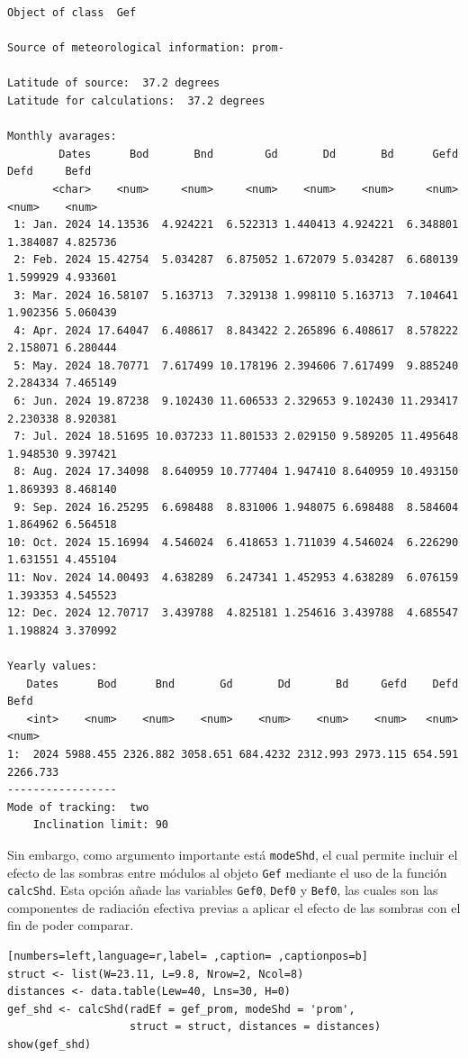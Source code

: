 \begin{verbatim}
Object of class  Gef 

Source of meteorological information: prom- 

Latitude of source:  37.2 degrees
Latitude for calculations:  37.2 degrees

Monthly avarages:
        Dates      Bod       Bnd        Gd       Dd       Bd      Gefd     Defd     Befd
       <char>    <num>     <num>     <num>    <num>    <num>     <num>    <num>    <num>
 1: Jan. 2024 14.13536  4.924221  6.522313 1.440413 4.924221  6.348801 1.384087 4.825736
 2: Feb. 2024 15.42754  5.034287  6.875052 1.672079 5.034287  6.680139 1.599929 4.933601
 3: Mar. 2024 16.58107  5.163713  7.329138 1.998110 5.163713  7.104641 1.902356 5.060439
 4: Apr. 2024 17.64047  6.408617  8.843422 2.265896 6.408617  8.578222 2.158071 6.280444
 5: May. 2024 18.70771  7.617499 10.178196 2.394606 7.617499  9.885240 2.284334 7.465149
 6: Jun. 2024 19.87238  9.102430 11.606533 2.329653 9.102430 11.293417 2.230338 8.920381
 7: Jul. 2024 18.51695 10.037233 11.801533 2.029150 9.589205 11.495648 1.948530 9.397421
 8: Aug. 2024 17.34098  8.640959 10.777404 1.947410 8.640959 10.493150 1.869393 8.468140
 9: Sep. 2024 16.25295  6.698488  8.831006 1.948075 6.698488  8.584604 1.864962 6.564518
10: Oct. 2024 15.16994  4.546024  6.418653 1.711039 4.546024  6.226290 1.631551 4.455104
11: Nov. 2024 14.00493  4.638289  6.247341 1.452953 4.638289  6.076159 1.393353 4.545523
12: Dec. 2024 12.70717  3.439788  4.825181 1.254616 3.439788  4.685547 1.198824 3.370992

Yearly values:
   Dates      Bod      Bnd       Gd       Dd       Bd     Gefd    Defd     Befd
   <int>    <num>    <num>    <num>    <num>    <num>    <num>   <num>    <num>
1:  2024 5988.455 2326.882 3058.651 684.4232 2312.993 2973.115 654.591 2266.733
-----------------
Mode of tracking:  two 
    Inclination limit: 90
\end{verbatim}

Sin embargo, como argumento importante está \texttt{modeShd}, el cual permite incluir el efecto de las sombras entre módulos al objeto \texttt{Gef} mediante el uso de la función \texttt{calcShd}. Esta opción añade las variables \texttt{Gef0}, \texttt{Def0} y \texttt{Bef0}, las cuales son las componentes de radiación efectiva previas a aplicar el efecto de las sombras con el fin de poder comparar.
\begin{lstlisting}[numbers=left,language=r,label= ,caption= ,captionpos=b]
struct <- list(W=23.11, L=9.8, Nrow=2, Ncol=8)
distances <- data.table(Lew=40, Lns=30, H=0)
gef_shd <- calcShd(radEf = gef_prom, modeShd = 'prom',
                   struct = struct, distances = distances)
show(gef_shd)
\end{lstlisting}

